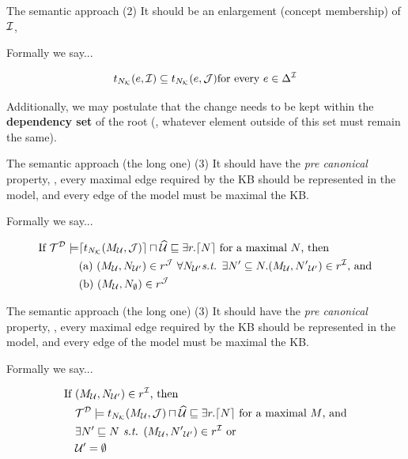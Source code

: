 \documentclass[10pt]{beamer}
\begin{document}
\begin{frame}[fragile]{The semantic approach}
  (2) It should be an enlargement (\wrt concept membership) of $\mathcal{I}$, \pause
   

  Formally we say... 

  \begin{equation*}
    t_{N_{\mathcal{K}}}({e}, {\mathcal{I}}) \subseteq t_{N_{\mathcal{K}}}({e}, {\mathcal{J}}) \text{for every } e \in \Delta^{\mathcal{I}}
  \end{equation*}

  Additionally, we may postulate that the change needs to be kept within the \textbf{dependency set} of the root (\ie, whatever element outside of this set must remain the same).
\end{frame}

\begin{frame}[fragile]{The semantic approach (the long one)}
  (3) It should have the \emph{pre canonical} property, \ie, {\color{red}every maximal edge required by the KB should be represented in the model}, and every edge of the model must be maximal \wrt the KB. \pause
   
  Formally we say... 

  \begin{align*}
    \text{If } \mathcal{T}^{\mathcal{D}} \models & \lceil{\ensuremath{t_{N_{\mathcal{K}}}({{M}_{\mathcal{U}}}, {\mathcal{J}})}}\rceil \sqcap \widehat{{\mathcal{U}}}  \sqsubseteq \exists r.\lceil{N}\rceil \text{ for a maximal } N \text{, then } \\ 
    & \text{(a) } ({M}_{\mathcal{U}}, {N}_{\mathcal{U}'} ) \in r^{\mathcal{J}} \text{ } \forall {N}_{\mathcal{U}'} \textit{s.t. } \exists N'\subseteq N. ({M}_{\mathcal{U}}, {N'}_{\mathcal{U}'}) \in r^{\mathcal{I}} \text{, and}\\ 
    & \text{(b) }({M}_{\mathcal{U}}, {N}_{\emptyset}) \in r^{\mathcal{J}}
  \end{align*}
\end{frame}

\begin{frame}[fragile]{The semantic approach (the long one)}
  (3) It should have the \emph{pre canonical} property, \ie, every maximal edge required by the KB should be represented in the model, and {\color{red} every edge of the model must be maximal \wrt the KB}. \pause
   
  Formally we say... 

  \begin{align*}
    \text{If }&({M}_{\mathcal{U}}, {N}_{\mathcal{U}'}) \in r^{\mathcal{I}}  \text{, then} \\
    & \mathcal{T}^{\mathcal{D}} \models t_{N_{\mathcal{K}}}({{M}_{\mathcal{U}}}, {\mathcal{J}}) \sqcap \widehat{{\mathcal{U}}} \sqsubseteq \exists r.\lceil{N}\rceil \text{ for a maximal } M \text{, and} \\
    & \exists N' \sqsubseteq N \textit{ s.t. } ({M}_{\mathcal{U}}, {N'}_{\mathcal{U}'}) \in r^{\mathcal{I}} \text{ or } \\
    & \mathcal{U}' = \emptyset 
  \end{align*}
\end{frame}
\end{document}
